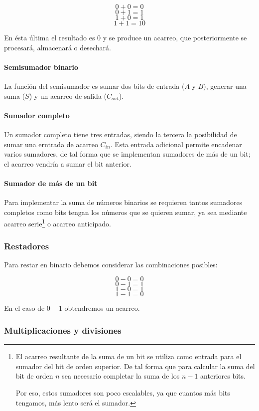\documentclass[a4paper, 11pt, titlepage]{article}
\begin{document}
			\[0 + 0 = 0\]
			\[0 + 1 = 1\]
			\[1 + 0 = 1\]
			\[1 + 1 = 10\]

			En ésta última el resultado es 0 y se produce un acarreo, que posteriormente se procesará, almacenará o desechará.

			\paragraph{Semisumador binario} La función del semisumador es sumar dos bits de entrada ($A$ y 
			$B$), generar una suma ($S$) y un acarreo de salida ($C_{out}$).

			\paragraph{Sumador completo} Un sumador completo tiene tres entradas, siendo la tercera la posibilidad 
			de sumar una erntrada de acarreo $C_{in}$. Esta entrada adicional permite encadenar varios sumadores, de 
			tal forma que se implementan sumadores de más de un bit; el acarreo vendría a sumar el bit anterior.

			\paragraph{Sumador de más de un bit} Para implementar la suma de números binarios se requieren tantos 
			sumadores completos como bits tengan los números que se quieren sumar, ya sea mediante acarreo 
			serie\footnote{
				El acarreo resultante de la suma de un bit se utiliza como entrada para el sumador del bit de 
				orden superior. De tal forma que para calcular la suma del bit de orden $n$ sea necesario completar 
				la suma de los $n-1$ anteriores bits. 

				Por eso, estos sumadores son poco escalables, ya que cuantos más bits tengamos, más lento será el sumador.
			} o acarreo anticipado.

		\subsubsection{Restadores}

			Para restar en binario debemos considerar las combinaciones posibles:

			\[0 - 0 = 0\]
			\[0 - 1 = 1\]
			\[1 - 0 = 1\]
			\[1 - 1 = 0\]

			En el caso de $0 - 1$ obtendremos un acarreo.

		\subsubsection{Multiplicaciones y divisiones}
\end{document}
